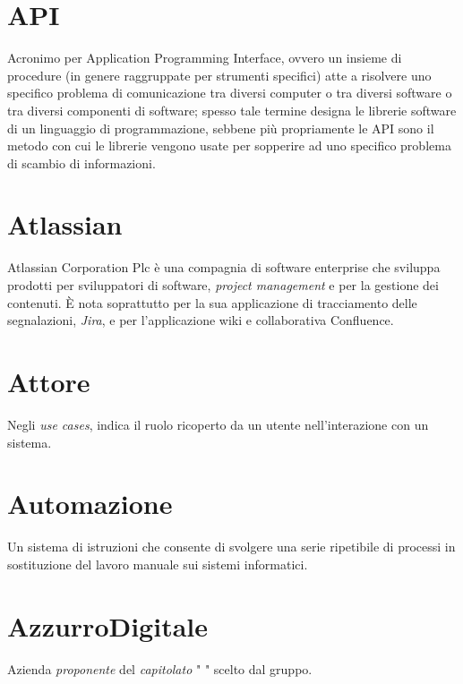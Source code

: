 \section{API}\label{sec:Application Programming Interface}
Acronimo per Application Programming Interface, ovvero un insieme di procedure (in genere raggruppate per strumenti specifici) atte a risolvere uno specifico problema di comunicazione tra diversi computer o tra diversi software o tra diversi componenti di software; spesso tale termine designa le librerie software di un linguaggio di programmazione, sebbene più propriamente le API sono il metodo con cui le librerie vengono usate per sopperire ad uno specifico problema di scambio di informazioni.

\section{Atlassian}
Atlassian Corporation Plc è una compagnia di software enterprise che sviluppa prodotti per sviluppatori di software, \emph{project management} e per la gestione dei contenuti. È nota soprattutto per la sua applicazione di tracciamento delle segnalazioni, \emph{Jira}, e per l'applicazione wiki e collaborativa Confluence.

\section{Attore}\label{sec:Attori}
Negli \emph{use cases}, indica il ruolo ricoperto da un utente nell'interazione con un sistema.

\section{Automazione}\label{sec:Automazioni}
Un sistema di istruzioni che consente di svolgere una serie ripetibile di processi in sostituzione del lavoro manuale sui sistemi informatici.

\section{AzzurroDigitale}
Azienda \emph{proponente} del \emph{capitolato} " " scelto dal gruppo.
